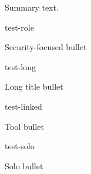 \documentclass{resume}
\begin{document}
\begin{summary}
  Summary text.
\end{summary}
\begin{experience}
  \begin{role}{test-role}
    \item Security-focused bullet
  \end{role}
  \begin{role}{test-long}
    \item Long title bullet
  \end{role}
\end{experience}
\begin{projects}
  \begin{project}{test-linked}
    \item Tool bullet
  \end{project}
  \begin{project}{test-solo}
    \item Solo bullet
  \end{project}
\end{projects}
\education[dissertation]
\end{document}
